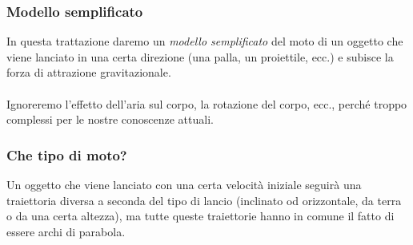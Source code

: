 \documentclass[]{beamer}
\theoremstyle{plain}
\begin{document}
\begin{frame}
  \frametitle{Modello semplificato}
In questa trattazione daremo un \emph{modello semplificato} del moto di un oggetto che viene lanciato in una certa direzione (una palla, un proiettile, ecc.) e subisce la forza di \alert{attrazione gravitazionale}.\pause\\~\\Ignoreremo l'effetto dell'aria sul corpo, la rotazione del corpo, ecc., perché troppo complessi per le nostre conoscenze attuali.
\end{frame}






\begin{frame}
  \frametitle{Che tipo di moto?}
Un oggetto che viene lanciato con una certa velocità iniziale seguirà una traiettoria diversa a seconda del tipo di lancio (inclinato od orizzontale, da terra o da una certa altezza), ma tutte queste traiettorie hanno in comune il fatto di essere \alert{archi di parabola}.



\begin{columns}
\begin{column}{0.3\textwidth}

\begin{figure}
\end{figure}

\end{column}
\begin{column}{0.3\textwidth}

\begin{figure}
\end{figure}

\end{column}
\begin{column}{0.3\textwidth}

\begin{figure}
\end{figure}

\end{column}
\end{columns}
\end{frame}
\end{document}
